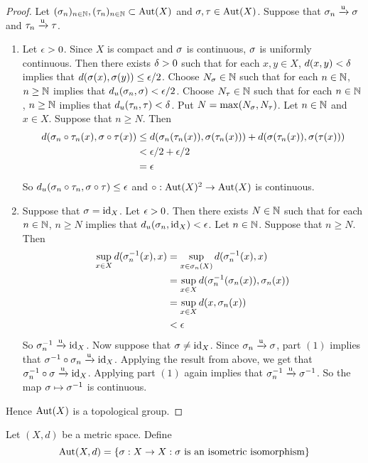 \documentclass{book}
\begin{document}
	\begin{proof}
	Let $(\sigma_n)_{n \in \mathbb{N}}, (\tau_n)_{n \in \mathbb{N}} \subset \operatorname{Aut}(X)$ and $\sigma,\tau \in \operatorname{Aut}(X)$. Suppose that $\sigma_n \xrightarrow{\text{u}} \sigma$ and $\tau_n \xrightarrow{\text{u}} \tau$.
	\begin{enumerate}
	\item Let $\epsilon >0$. Since $X$ is compact and $\sigma$ is continuous, $\sigma$ is uniformly continuous. Then there exists $\delta >0$ such that for each $x, y \in X$, $d(x,y) < \delta$ implies that $d(\sigma(x), \sigma(y)) \leq \epsilon/2$.  Choose $N_\sigma \in \mathbb{N}$ such that for each $n \in \mathbb{N}$, $ n \geq \mathbb{N}$ implies that $d_u(\sigma_n, \sigma) < \epsilon/2$. Choose $N_\tau \in \mathbb{N}$ such that for each $n \in \mathbb{N}$, $ n \geq \mathbb{N}$ implies that $d_u(\tau_n, \tau) < \delta$. Put $N = \max(N_\sigma, N_\tau)$. Let $n \in \mathbb{N}$ and $x \in X$. Suppose that $n \geq N$. Then 
	\begin{align*}
		d(\sigma_n \circ \tau_n (x) ,\sigma \circ \tau (x) ) 
		&\leq  d(\sigma_n(\tau_n(x)),  \sigma(\tau_n(x))) + d( \sigma(\tau_n (x)), \sigma( \tau (x))) \\
		& < \epsilon / 2 +\epsilon / 2 \\
		&= \epsilon 
	\end{align*}
	So $d_u(\sigma_n \circ \tau_n, \sigma\circ \tau) \leq \epsilon$ and $\circ: \operatorname{Aut}(X)^2 \rightarrow \operatorname{Aut}(X)$ is continuous. 
	\item Suppose that $\sigma = \operatorname{id}_X$. Let $\epsilon >0$. Then there exists $N \in \mathbb{N}$ such that for each $n \in \mathbb{N}$, $n \geq N$ implies that $d_u(\sigma_n, \operatorname{id}_X) < \epsilon$. Let $n \in \mathbb{N}$. Suppose that $n \geq N$. Then 
	\begin{align*}
	\sup_{x \in X} d(\sigma^{-1}_n(x), x) 
	&= \sup_{x \in \sigma_n(X)}d(\sigma^{-1}_n(x), x) \\
	&= \sup_{x \in X}d(\sigma^{-1}_n(\sigma_n(x)), \sigma_n(x)) \\
	&= \sup_{x \in X}d(x, \sigma_n(x)) \\
	&< \epsilon
	\end{align*}
	So $\sigma^{-1}_n \xrightarrow{\text{u}} \operatorname{id}_X$. Now suppose that $\sigma \neq \operatorname{id}_X$. Since $\sigma_n \xrightarrow{\text{u}} \sigma$, part $(1)$ implies that $\sigma^{-1} \circ \sigma_n \xrightarrow{\text{u}} \operatorname{id}_X$. Applying the result from above, we get that $\sigma_n^{-1} \circ \sigma \xrightarrow{\text{u}} \operatorname{id}_X$. Applying part $(1)$ again implies that $\sigma_n^{-1}  \xrightarrow{\text{u}}  \sigma^{-1}$. So the map $\sigma \mapsto \sigma^{-1}$ is continuous. 
	\end{enumerate}
	Hence $\operatorname{Aut}(X)$ is a topological group. 
	\end{proof}
	
	\begin{defn} \ld{}
	Let $(X, d)$ be a metric space. Define 
	$$\operatorname{Aut}(X, d) = \{\sigma:X\rightarrow X: \sigma \text{ is an isometric isomorphism} \}$$  
	\end{defn}
	
\end{document}

